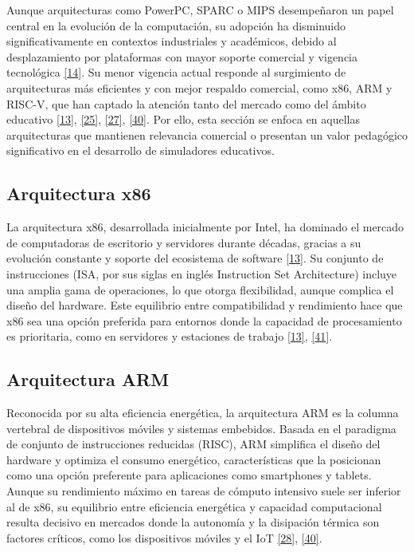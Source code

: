 \documentclass[12pt,oneside]{templates/unerthesis}
\begin{document}
Aunque arquitecturas como PowerPC, SPARC o MIPS desempeñaron un papel central en la evolución de la computación, su adopción ha disminuido significativamente en contextos industriales y académicos, debido al desplazamiento por plataformas con mayor soporte comercial y vigencia tecnológica \protect\hyperlink{ref-stallings_computer_2021}{{[}14{]}}. Su menor vigencia actual responde al surgimiento de arquitecturas más eficientes y con mejor respaldo comercial, como x86, ARM y RISC-V, que han captado la atención tanto del mercado como del ámbito educativo \protect\hyperlink{ref-hennessy2017computer}{{[}13{]}}, \protect\hyperlink{ref-waterman_risc-v_2014}{{[}25{]}}, \protect\hyperlink{ref-null_essentials_2014}{{[}27{]}}, \protect\hyperlink{ref-arm_evolution_2025}{{[}40{]}}. Por ello, esta sección se enfoca en aquellas arquitecturas que mantienen relevancia comercial o presentan un valor pedagógico significativo en el desarrollo de simuladores educativos.

\hypertarget{arquitectura-x86}{%
\subsection{Arquitectura x86}\label{arquitectura-x86}}

La arquitectura x86, desarrollada inicialmente por Intel, ha dominado el mercado de computadoras de escritorio y servidores durante décadas, gracias a su evolución constante y soporte del ecosistema de software \protect\hyperlink{ref-hennessy2017computer}{{[}13{]}}. Su conjunto de instrucciones (ISA, por sus siglas en inglés Instruction Set Architecture) incluye una amplia gama de operaciones, lo que otorga flexibilidad, aunque complica el diseño del hardware. Este equilibrio entre compatibilidad y rendimiento hace que x86 sea una opción preferida para entornos donde la capacidad de procesamiento es prioritaria, como en servidores y estaciones de trabajo \protect\hyperlink{ref-hennessy2017computer}{{[}13{]}}, \protect\hyperlink{ref-intel_whitepaper_2023}{{[}41{]}}.

\hypertarget{arquitectura-arm}{%
\subsection{Arquitectura ARM}\label{arquitectura-arm}}

Reconocida por su alta eficiencia energética, la arquitectura ARM es la columna vertebral de dispositivos móviles y sistemas embebidos. Basada en el paradigma de conjunto de instrucciones reducidas (RISC), ARM simplifica el diseño del hardware y optimiza el consumo energético, características que la posicionan como una opción preferente para aplicaciones como smartphones y tablets. Aunque su rendimiento máximo en tareas de cómputo intensivo suele ser inferior al de x86, su equilibrio entre eficiencia energética y capacidad computacional resulta decisivo en mercados donde la autonomía y la disipación térmica son factores críticos, como los dispositivos móviles y el IoT \protect\hyperlink{ref-patterson_computer_2014}{{[}28{]}}, \protect\hyperlink{ref-arm_evolution_2025}{{[}40{]}}.
\end{document}
